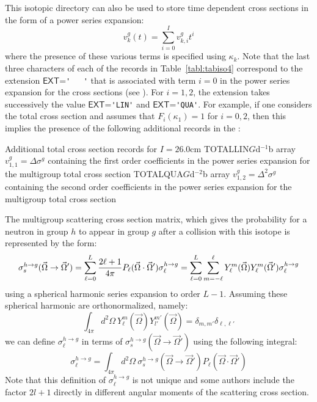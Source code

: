 This isotopic directory can also be used to store time dependent cross sections in the form of a power series expansion:
\begin{equation}
    v_{k}^{g}(t)=\sum_{i=0}^{I} v_{k,i}^{g} t^{i}
\label{eq:TimeSerie}
\end{equation}
where the presence of these various terms is specified using $\kappa_{k}$.
Note that the last three characters of each of the records in Table~\ref{tabl:tabiso4} correspond to the extension $\mathsf{EXT}$=\verb*|'   '| that is
associated with term $i=0$ in the power series expansion for the cross sections (see
). For $i=1, 2$, the extension takes successively the value $\mathsf{EXT}$=\verb*|'LIN'| and $\mathsf{EXT}$=\verb*|'QUA'|.
For example, if one considers the total cross section and assumes that $F_{i}(\kappa_{1})=1$ for $i=0,2$, then this implies the presence
of the following additional records in the :

\begin{DescriptionEnregistrement}{Additional total cross section records for $I=2$}{6.0cm}
\RealEnr
  {TOTALLIN}{$G$}{d$^{-1}$b}
  {array  $v_{1,1}^{g}=\Delta\sigma^{g}$ containing the first order coefficients in the power series expansion for the multigroup total
cross section}
\RealEnr
  {TOTALQUA}{$G$}{d$^{-2}$b}
  {array  $v_{1,2}^{g}=\Delta^{2}\sigma^{g}$ containing the second order coefficients in the power series expansion for the multigroup
total cross section}
\end{DescriptionEnregistrement}

\vskip 0.2cm

The multigroup scattering cross section matrix, which gives the probability for a
neutron in group $h$ to appear in group $g$ after a collision with this isotope
is represented by the form:
  \begin{displaymath}
    \sigma_{s}^{h\to g}(\vec{\Omega}\to\vec{\Omega}')
      =\sum_{\ell=0}^{L}{{2\ell+1}\over{4\pi}} P_{\ell}(\vec{\Omega}\cdot\vec{\Omega}')
    \sigma_{\ell}^{h\to g}
      =\sum_{\ell=0}^{L}\sum_{m=-\ell}^{\ell}
      Y_{\ell}^{m}(\vec{\Omega})Y_{\ell}^{m}(\vec{\Omega}')\sigma_{\ell}^{h\to g}
  \end{displaymath}
using a spherical harmonic series expansion to order $L-1$. Assuming these 
spherical harmonic are orthonormalized, namely:
  \begin{displaymath}
    \int_{4\pi} d^{2}\Omega \ Y_{\ell}^{m}(\vec{\Omega}) Y_{l'}^{m'}(\vec{\Omega})=
    \delta_{m,m'}\delta_{\ell,\ell'}
  \end{displaymath}
we can define $\sigma_{\ell}^{h\to g}$ in terms of $\sigma_{s}^{h\to
g}(\vec{\Omega}\to\vec{\Omega}')$ using the following integral:
  \begin{displaymath}
    \sigma_{\ell}^{h\to g}
      =\int_{4\pi}d^{2}\Omega \ \sigma_{s}^{h\to g}(\vec{\Omega}\to\vec{\Omega}')
     P_{\ell}(\vec{\Omega}\cdot\vec{\Omega}')
  \end{displaymath}
Note that this definition of $\sigma_{\ell}^{h\to g}$ is not unique and some authors
include the factor $2l+1$ directly in different angular moments of the 
scattering cross section.


